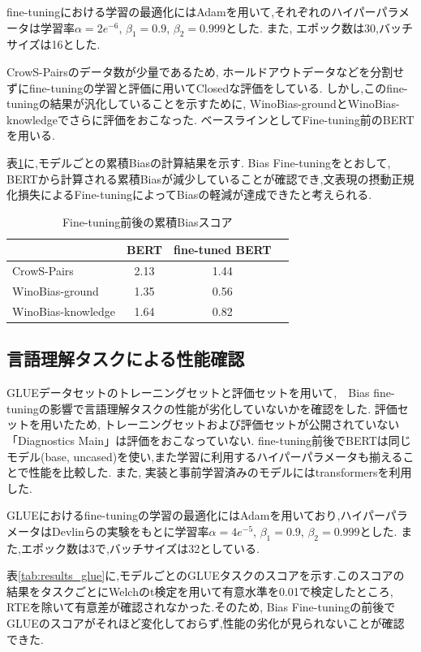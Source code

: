 \documentclass[
  platex, dvipdfmx %
]{nlp2021}
\begin{document}
fine-tuningにおける学習の最適化にはAdamを用いて,それぞれのハイパーパラメータは学習率$\alpha = 2e^{-6}$, $\beta_1 = 0.9$, $\beta_2 = 0.999$とした.
また, エポック数は30,バッチサイズは16とした.

CrowS-Pairsのデータ数が少量であるため, ホールドアウトデータなどを分割せずにfine-tuningの学習と評価に用いてClosedな評価をしている.
しかし,このfine-tuningの結果が汎化していることを示すために, WinoBias-groundとWinoBias-knowledgeでさらに評価をおこなった.
ベースラインとしてFine-tuning前のBERTを用いる.

表\ref{tab:results_bias}に,モデルごとの累積Biasの計算結果を示す.
Bias Fine-tuningをとおして, BERTから計算される累積Biasが減少していることが確認でき,文表現の摂動正規化損失によるFine-tuningによってBiasの軽減が達成できたと考えられる.

\begin{table}[h]
\centering
\begin{tabular}{lccc}
\hline
 &  BERT & fine-tuned BERT \\
\hline
CrowS-Pairs & 2.13 &  1.44 \\
WinoBias-ground & 1.35 &  0.56  \\
WinoBias-knowledge & 1.64 & 0.82 \\
\hline
\end{tabular}
\caption{Fine-tuning前後の累積Biasスコア}
\label{tab:results_bias}
\end{table}

\subsection{言語理解タスクによる性能確認}
GLUEデータセットのトレーニングセットと評価セットを用いて,　Bias fine-tuningの影響で言語理解タスクの性能が劣化していないかを確認をした.
評価セットを用いたため, トレーニングセットおよび評価セットが公開されていない「Diagnostics Main」は評価をおこなっていない.
fine-tuning前後でBERTは同じモデル(base, uncased)を使い,また学習に利用するハイパーパラメータも揃えることで性能を比較した.
また, 実装と事前学習済みのモデルにはtransformers\cite{wolf-etal-2020-transformers}を利用した.

GLUEにおけるfine-tuningの学習の最適化にはAdamを用いており,ハイパーパラメータはDevlinら\cite{devlin2018bert}の実験をもとに学習率$\alpha = 4e^{-5}$, $\beta_1 = 0.9$, $\beta_2 = 0.999$とした.
また,エポック数は3で,バッチサイズは32としている.

表\ref{tab:results_glue}に,モデルごとのGLUEタスクのスコアを示す.このスコアの結果をタスクごとにWelchのt検定を用いて有意水準を0.01で検定したところ, RTEを除いて有意差が確認されなかった.そのため, Bias Fine-tuningの前後でGLUEのスコアがそれほど変化しておらず,性能の劣化が見られないことが確認できた.
\end{document}
